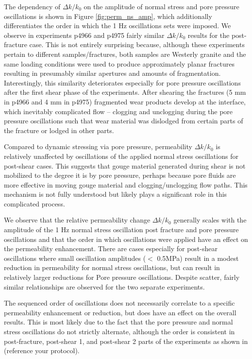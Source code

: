 \documentclass[letterpaper,10pt]{article}
\begin{document}
The dependency of $ \Delta k/k_0 $ on the amplitude of normal stress and pore pressure oscillations is shown in Figure \ref{fig:perm_ns_amp}, which additionally differentiates the order in which the 1 Hz oscillations sets were imposed. We observe in experiments p4966 and p4975 fairly similar $ \Delta k/k_0 $ results for the post-fracture case. This is not entirely surprising because, although these experiments pertain to different samples/fractures, both samples are Westerly granite and the same loading conditions were used to produce approximately planar fractures resulting in presumably similar apertures and amounts of fragmentation. Interestingly, this similarity deteriorates especially for pore pressure oscillations after the first shear phase of the experiments. After shearing the fractures (5 mm in p4966 and 4 mm in p4975) fragmented wear products develop at the interface, which inevitably complicated flow -- clogging and unclogging during the pore pressure oscillations such that wear material was dislodged from certain parts of the fracture or lodged in other parts.

Compared to dynamic stressing via pore pressure, permeability $ \Delta k/k_0 $ is relatively unaffected by oscillations of the applied normal stress oscillations for post-shear cases. This suggests that gouge material generated during shear is not mobilized to the degree it is by pore pressure, perhaps because pore fluids are more effective in moving gouge material and clogging/unclogging flow paths. This mechanism is not fully understood but likely plays a significant role in this complicated process.

We observe that the relative permeability change $ \Delta k/k_0 $ generally scales with the amplitude of the 1 Hz normal stress oscillation post fracture and pore pressure oscillations and that the order in which oscillations were applied have an effect on the permeability enhancement. There are cases especially for post-shear oscillations where small oscillation amplitudes ($< $ 0.5MPa) result in a modest reduction in permeability for normal stress oscillations, but can result in relatively larger reductions for Pore pressure oscillations. Despite scatter, fairly similar relationships are observed for the two separate experiments.

The sequenced order of oscillations does not necessarily correlate to a specific permeability enhancement or reduction, but does have an effect on the overall results. This is most likely due to the fact that the pore pressure and normal stress oscillations do not strictly alternate, although the order is consistent in post-fracture, post-shear 1, and post-shear 2 parts of the experiments as shown in (reference your protocol).
\end{document}
